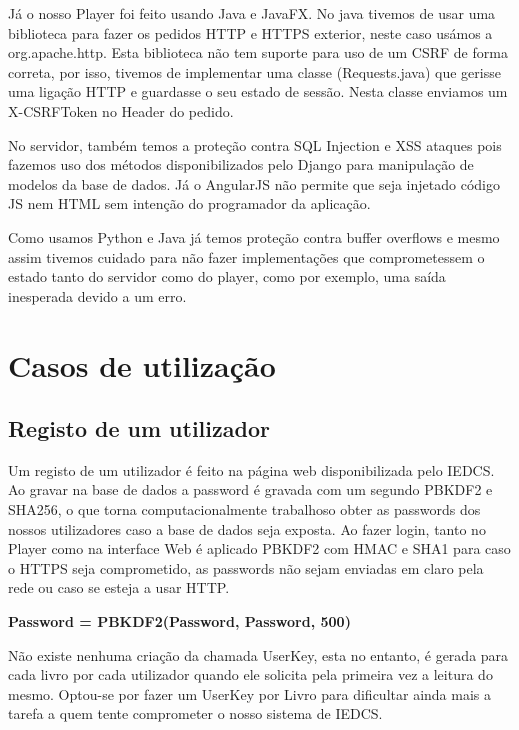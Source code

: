 \documentclass[pdftex,12pt,a4paper]{report}
\begin{document}
Já o nosso Player foi feito usando Java e JavaFX. No java tivemos de usar uma biblioteca para fazer os pedidos HTTP e HTTPS exterior, neste caso usámos a org.apache.http. Esta biblioteca não tem suporte para uso de um CSRF de forma correta, por isso, tivemos de implementar uma classe (Requests.java) que gerisse uma ligação HTTP e guardasse o seu estado de sessão. Nesta classe enviamos um X-CSRFToken no Header do pedido.

No servidor, também temos a proteção contra SQL Injection e XSS ataques pois fazemos uso dos métodos disponibilizados pelo Django para manipulação de modelos da base de dados. Já o AngularJS não permite que seja injetado código JS nem HTML sem intenção do programador da aplicação.

Como usamos Python e Java já temos proteção contra buffer overflows e mesmo assim tivemos cuidado para não fazer implementações que comprometessem o estado tanto do servidor como do player, como por exemplo, uma saída inesperada devido a um erro.

\section{Casos de utilização}

\subsection{Registo de um utilizador}

Um registo de um utilizador é feito na página web disponibilizada pelo IEDCS. Ao gravar na base de dados a password é gravada com um segundo PBKDF2 e SHA256, o que torna computacionalmente trabalhoso obter as passwords dos nossos utilizadores caso a base de dados seja exposta. Ao fazer login, tanto no Player como na interface Web é aplicado PBKDF2 com HMAC e SHA1 para caso o HTTPS seja comprometido, as passwords não sejam enviadas em claro pela rede ou  caso se esteja a usar HTTP.

\begin{center}
	\textbf{Password = PBKDF2(Password, Password, 500)}
\end{center}

Não existe nenhuma criação da chamada UserKey, esta no entanto, é gerada para cada livro por cada utilizador quando ele solicita pela primeira vez a leitura do mesmo. Optou-se por fazer um UserKey por Livro para dificultar ainda mais a tarefa a quem tente comprometer o nosso sistema de IEDCS.
\end{document}
